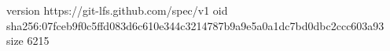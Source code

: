 version https://git-lfs.github.com/spec/v1
oid sha256:07fceb9f0c5ffd083d6c610e344c3214787b9a9e5a0a1dc7bd0dbc2ccc603a93
size 6215
